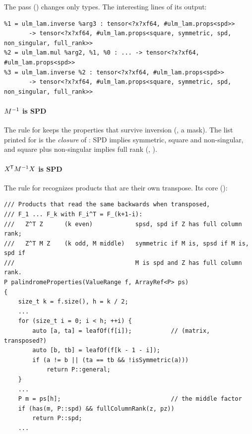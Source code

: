 The pass 
() changes only types. The
interesting lines of its output:

\begin{lstlisting}
%1 = ulm_lam.inverse %arg3 : tensor<?x?xf64, #ulm_lam.props<spd>>
       -> tensor<?x?xf64, #ulm_lam.props<square, symmetric, spd, non_singular, full_rank>>
%2 = ulm_lam.mul %arg2, %1, %0 : ... -> tensor<?x?xf64, #ulm_lam.props<spd>>
%3 = ulm_lam.inverse %2 : tensor<?x?xf64, #ulm_lam.props<spd>>
       -> tensor<?x?xf64, #ulm_lam.props<square, symmetric, spd, non_singular, full_rank>>
\end{lstlisting}

\paragraph{\(M^{-1}\) is SPD} The rule for  keeps the
properties that survive inversion (, a mask). The
list printed for  is the \emph{closure} of : SPD
implies symmetric, square and non-singular, and square plus non-singular
implies full rank (, ).

\paragraph{\(X^{\mkern-1.5mu\mathsf{T}} M^{-1} X\) is SPD} The rule for  recognizes
products that are their own transpose. Its core
():

\begin{lstlisting}[style=cpp]
/// Products that read the same backwards when transposed,
/// F_1 ... F_k with F_i^T = F_(k+1-i):
///   Z^T Z      (k even)            spsd, spd if Z has full column rank;
///   Z^T M Z    (k odd, M middle)   symmetric if M is, spsd if M is, spd if
///                                  M is spd and Z has full column rank.
P palindromeProperties(ValueRange f, ArrayRef<P> ps)
{
    size_t k = f.size(), h = k / 2;
    ...
    for (size_t i = 0; i < h; ++i) {
        auto [a, ta] = leafOf(f[i]);           // (matrix, transposed?)
        auto [b, tb] = leafOf(f[k - 1 - i]);
        if (a != b || (ta == tb && !isSymmetric(a)))
            return P::general;
    }
    ...
    P m = ps[h];                               // the middle factor
    if (has(m, P::spd) && fullColumnRank(z, pz))
        return P::spd;
    ...
\end{lstlisting}

